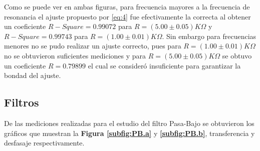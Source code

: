 \documentclass[11pt,a4paper]{article}
\begin{document}
Como se puede ver en ambas figuras, para frecuencia mayores a la frecuencia de resonancia el ajuste propuesto por \eqref{eq:4} fue efectivamente la correcta al obtener un coeficiente $R-Square=0.99072$ para $R=(5.00 \pm 0.05)K\Omega$ y $R-Square=0.99743$ para $R=(1.00 \pm 0.01)K\Omega$. Sin embargo para frecuencias menores no se pudo realizar un ajuste correcto, pues para $R=(1.00 \pm 0.01)K\Omega$ no se obtuvieron suficientes mediciones y para $R=(5.00 \pm 0.05)K\Omega$ se obtuvo un coeficiente $R=0.79899$ el cual se consideró insuficiente para garantizar la bondad del ajuste.

\newpage

\subsection{Filtros}

De las mediciones realizadas para el estudio del filtro Pasa-Bajo se obtuvieron los gráficos que muestran la \textbf{Figura \ref{subfig:PB.a}} y \textbf{\ref{subfig:PB.b}}, transferencia y desfasaje respectivamente.
\end{document}
